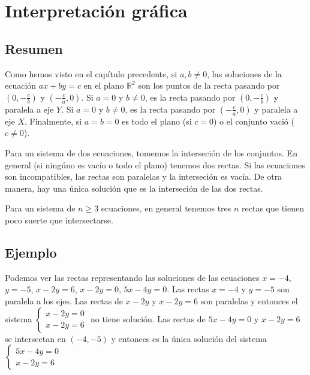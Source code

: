 \section{Interpretación gráfica}

\subsection*{Resumen}

Como hemos visto en el capítulo precedente,
si $a,b \neq 0$, las soluciones de la ecuación $ax+by=c$ en el plano
${\mathbb R}^2$ son los puntos de la recta pasando por $(0, -\frac{c}{b})$ y
$(-\frac{c}{a}, 0)$. Si $a = 0$ y $b \neq 0$, es la recta pasando por
$(0, -\frac{c}{b})$ y paralela a eje $Y$. Si $a = 0$ y $b \neq 0$, es la recta
pasando por $(-\frac{c}{a}, 0)$ y paralela a eje $X$. Finalmente, si
$a = b = 0$ es todo el plano (si $c = 0$) o el conjunto vació ($c \neq 0$).

Para un sistema de dos ecuaciones, tomemos la interseción de los conjuntos.
En general (si ningúno es vacío o todo el plano) tenemos dos rectas. Si las
ecuaciones son incompatibles, las rectas son paralelas y la interseción es
vacía. De otra manera, hay una única solución que es la interseción de las dos
rectas.

Para un sistema de $n \geq 3$ ecuaciones, en general tenemos tres $n$ rectas
que tienen poco suerte que intersectarse.

\subsection*{Ejemplo}

Podemos ver las rectas representando las soluciones de las ecuaciones
$x=-4$, $y=-5$, $x-2y=6$, $x-2y=0$, $5x-4y=0$. Las rectas $x=-4$ y $y = -5$ son
paralela a los ejes. Las rectas de $x - 2y$ y $x - 2y = 6$ son paralelas y
entonces el sistema $\left\{\begin{aligned}
   x-2y=0 \\
  x-2y=6
\end{aligned}\right.$ no tiene solución. Las rectas de $5x - 4y = 0$ y
$x - 2y = 6$ se intersectan en $(-4, -5)$ y entonces es la única solución del
sistema $\left\{\begin{aligned}
   5x-4y=0 \\
  x-2y=6
\end{aligned}\right.$

